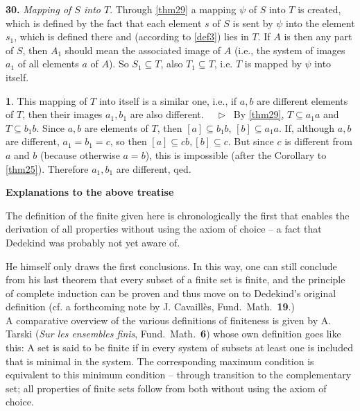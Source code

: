 \documentclass[leqno,hidelinks]{article}
\theoremstyle{definition}
\newtheorem{satz}{\protect\satzname}
\newcommand{\satzname}{}
\renewcommand{\satzname}{\hspace{-4pt}.\ Satz}%
\renewcommand{\satzname}{\hspace{-4pt}.\ Theorem}%
\newcommand\Beweis{\medskip \newline $ \phantom{'.'} \rhd \ $}%
\newcommand{\partof}{\subseteq}
\newcommand{\sref}[1]{\underline{\ref{#1}}}%
\begin{document}
\begin{paracol}{2}
\noindent \textbf{30.}\label{thm30} \hspace{-10pt} \emph{Mapping of $S$ into $T$}.
Through \sref{thm29} a mapping $\psi$ of $S$ into $T$ is
created, which is defined by the fact that each element $s$ of $S$ is sent by
$\psi$ into the element $s_1$, which is defined there and (according to \sref{def3})
lies in $T$. If $A$ is then any part of $S$, then $A_1$ should mean the associated
image of $A$ (i.e., the system of images $a_1$ of all elements $a$ of $A$). So
$S_1 \partof T$, also $T_1 \partof T$, i.e. $T$ is mapped by $\psi$ into itself.

\begin{satz}\label{thm31}
This mapping of $T$ into itself is a similar one, i.e., if $a, b$ are different
elements of $T$, then their images $a_1, b_1$ are also different.%
\Beweis
By \sref{thm29}, $T \partof a_1a$ and $T \partof b_1b$. Since $a, b$ are elements
of $T$, then $[a] \partof b_1b$, $[b] \partof a_1a$. If, although $a, b$ are
different, $a_1 = b_1  = c$, so then $[a] \partof cb, [b] \partof c$. But since
$c$ is different from $a$ and $b$ (because otherwise $a = b$), this is impossible
(after the Corollary to \sref{thm25}). Therefore $a_1, b_1$ are different, qed.
\end{satz}

\newpage

\hspace{84pt}

\begin{center}{\Large\textbf{Explanations to the above treatise \ \\ }}
\end{center}

\vspace{36pt}

The definition of the finite given here is chronologically the first that enables
the derivation of all properties without using the axiom of choice -- a fact that
Dedekind was probably not yet aware of.

He himself only draws the first conclusions. In this way, one can still conclude
from his last theorem that every subset of a finite set is finite, and the principle
of complete induction can be proven and thus move on to Dedekind's original
definition (cf. a forthcoming note by J. Cavaillès, Fund.\ Math.\ \textbf{19}.)
\ \\

A comparative overview of the various definitions of finiteness is given by A.
Tarski (\emph{Sur les ensembles finis}, Fund.\ Math.\ \textbf{6}) whose own
definition goes like this: A set is said to be finite if in every system of
subsets at least one is included that is minimal in the system. The corresponding
maximum condition is equivalent to this minimum condition -- through transition to the
complementary set; all properties of finite sets follow from both without using
the axiom of choice.
\ \\


\end{paracol}
\end{document}
